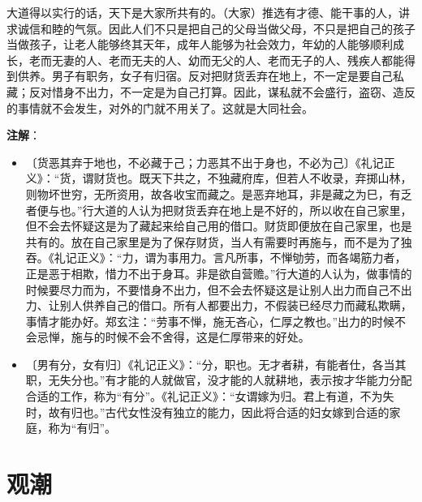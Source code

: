 \documentclass[12pt,UTF-8,openany,a4]{ctexbook}
\begin{document}
\vspace{1em}

\begin{large}\yiwen
    
    大道得以实行的话，天下是大家所共有的。（大家）推选有才德、能干事的人，讲求诚信和睦的气氛。因此人们不只是把自己的父母当做父母，不只是把自己的孩子当做孩子，让老人能够终其天年，成年人能够为社会效力，年幼的人能够顺利成长，老而无妻的人、老而无夫的人、幼而无父的人、老而无子的人、残疾人都能得到供养。男子有职务，女子有归宿。反对把财货丢弃在地上，不一定是要自己私藏；反对惜身不出力，不一定是为自己打算。因此，谋私就不会盛行，盗窃、造反的事情就不会发生，对外的门就不用关了。这就是大同社会。
    

\end{large}


\newpage

\begin{Large}
   \noindent \textbf{注解}：
\end{Large}

\vspace{-1em}

\begin{itemize}
    \setlength\itemsep{-0.2em}
    \item〔货恶其弃于地也，不必藏于己；力恶其不出于身也，不必为己〕{\yiwen 《礼记正义》：“货，谓财货也。既天下共之，不独藏府库，但若人不收录，弃掷山林，则物坏世穷，无所资用，故各收宝而藏之。是恶弃地耳，非是藏之为巳，有乏者便与也。”行大道的人认为把财货丢弃在地上是不好的，所以收在自己家里，但不会去怀疑这是为了藏起来给自己用的借口。财货即便放在自己家里，也是共有的。放在自己家里是为了保存财货，当人有需要时再施与，而不是为了独吞。《礼记正义》：“力，谓为事用力。言凡所事，不惮劬劳，而各竭筋力者，正是恶于相欺，惜力不出于身耳。非是欲自营赡。”行大道的人认为，做事情的时候要尽力而为，不要惜身不出力，但不会去怀疑这是让别人出力而自己不出力、让别人供养自己的借口。所有人都要出力，不假装已经尽力而藏私欺瞒，事情才能办好。郑玄注：“劳事不惮，施无吝心，仁厚之教也。”出力的时候不会忌惮，施与的时候不会不舍得，这是仁厚带来的好处。}
    \item〔男有分，女有归〕{\yiwen 《礼记正义》：“分，职也。无才者耕，有能者仕，各当其职，无失分也。”有才能的人就做官，没才能的人就耕地，表示按才华能力分配合适的工作，称为“有分”。《礼记正义》：“女谓嫁为归。君上有道，不为失时，故有归也。”古代女性没有独立的能力，因此将合适的妇女嫁到合适的家庭，称为“有归”。}
\end{itemize}

\chapter{观潮}
\end{document}

